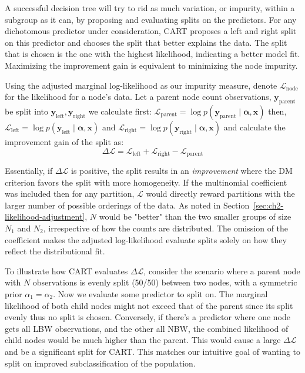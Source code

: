 A successful decision tree will try to rid as much variation, or impurity, within a subgroup as it can, by proposing and evaluating splits on the predictors. For any dichotomous predictor under consideration, CART proposes a left and right split on this predictor and chooses the split that better explains the data. The split that is chosen is the one with the highest likelihood, indicating a better model fit. Maximizing the improvement gain is equivalent to minimizing the node impurity.

Using the adjusted marginal log-likelihood as our impurity measure, denote \(\mathcal{L}_{\text{node}}\) for the likelihood for a node's data. Let a parent node count observations, \(\mathbf{y}_{\text{parent}}\) be split into  \(\mathbf{y}_{\text{left}},\mathbf{y}_{\text{right}}\)  we calculate first: \( 
    \mathcal{L}_{\text{parent}} = \log p(\mathbf{y}_{\text{parent}} \mid \boldsymbol{\alpha}, \mathbf{x})
\) then, 
\(
    \mathcal{L}_{\text{left}} = \log p(\mathbf{y}_{\text{left}} \mid \boldsymbol{\alpha},\mathbf{x})
\)
and 
\(
    \mathcal{L}_{\text{right}} = \log p(\mathbf{y}_{\text{right}} \mid \boldsymbol{\alpha},\mathbf{x})
\) and calculate the improvement gain of the split as: 
\[
    \Delta \mathcal{L} = \mathcal{L}_{\text{left}} + \mathcal{L}_{\text{right}} - \mathcal{L}_{\text{parent}}
\]

Essentially, if \(\Delta\mathcal{L}\) is positive, the split results in an \emph{improvement} where the DM criterion favors the split with more homogeneity. If the multinomial coefficient was included then for any partition, \(\mathcal{L}\) would directly reward partitions with the larger number of possible orderings of the data. As noted in Section~\ref{sec:ch2-likelihood-adjustment}, \(N\) would be "better" than the two smaller groups of size \(N_1\) and \(N_2\), irrespective of how the counts are distributed. The omission of the coefficient makes the adjusted log-likelihood evaluate splits solely on how they reflect the distributional fit. 

To illustrate how CART evaluates \(\Delta\mathcal{L}\), consider the scenario where a parent node with \(N\) observations is evenly split (50/50) between two nodes, with a symmetric prior \(\alpha_1 = \alpha_2\). Now we evaluate some predictor to split on. The marginal likelihood of both child nodes might not exceed that of the parent since its split evenly thus no split is chosen. Conversely, if there's a predictor where one node gets all LBW observations, and the other all NBW, the combined likelihood of child nodes would be much higher than the parent. This would cause a large \(\Delta\mathcal{L}\) and be a significant split for CART. This matches our intuitive goal of wanting to split on improved subclassification of the population.

